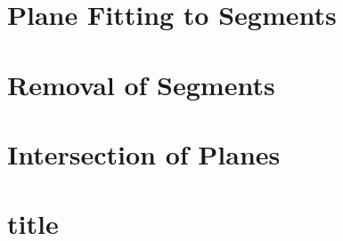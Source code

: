 \section{Plane Fitting to Segments}

\section{Removal of Segments}

\section{Intersection of Planes}

\section{title}